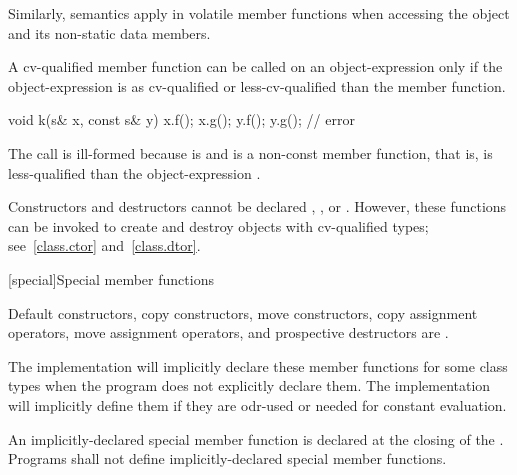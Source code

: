 \pnum
Similarly,  semantics apply in
volatile member functions when accessing the object and its
non-static data members.

\pnum
A cv-qualified member function can be called on an
object-expression only if the object-expression is as
cv-qualified or less-cv-qualified than the member function.
\begin{example}
\begin{codeblock}
void k(s& x, const s& y) {
  x.f();
  x.g();
  y.f();
  y.g();                        // error
}
\end{codeblock}

The call  is ill-formed because  is 
and  is a non-const member function, that is,
 is less-qualified than the object-expression .
\end{example}

\pnum
{}%
%
%
%
\begin{note}
Constructors and destructors
cannot be declared , , or 
.
However, these functions can be invoked
to create and destroy objects with cv-qualified types;
see~\ref{class.ctor} and~\ref{class.dtor}.
\end{note}

[special]{Special member functions}

%
%
%
%

\pnum
{}%
%
%
%
%
Default constructors,
copy constructors, move constructors,
copy assignment operators, move assignment operators,
and prospective destructors are
.
\begin{note}
The implementation will implicitly declare these member functions for some class
types when the program does not explicitly declare them.
The implementation will implicitly define them
if they are odr-used or
needed for constant evaluation.
\end{note}
An implicitly-declared special member function is declared at the closing
\tcode{\}} of the .
Programs shall not define implicitly-declared special member functions.


